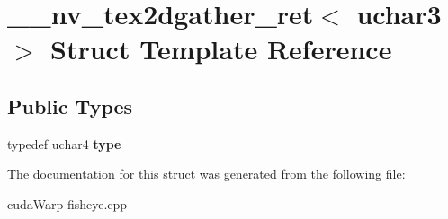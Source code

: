 \hypertarget{struct____nv__tex2dgather__ret_3_01uchar3_01_4}{}\section{\+\_\+\+\_\+nv\+\_\+tex2dgather\+\_\+ret$<$ uchar3 $>$ Struct Template Reference}
\label{struct____nv__tex2dgather__ret_3_01uchar3_01_4}
\subsection*{Public Types}
\begin{DoxyCompactItemize}
\item 
typedef uchar4 {\bfseries type}\hypertarget{struct____nv__tex2dgather__ret_3_01uchar3_01_4_a77d7e27565d5c2f46044b68cd625fc61}{}\label{struct____nv__tex2dgather__ret_3_01uchar3_01_4_a77d7e27565d5c2f46044b68cd625fc61}

\end{DoxyCompactItemize}


The documentation for this struct was generated from the following file\+:\begin{DoxyCompactItemize}
\item 
cuda\+Warp-\/fisheye.\+cpp\end{DoxyCompactItemize}
